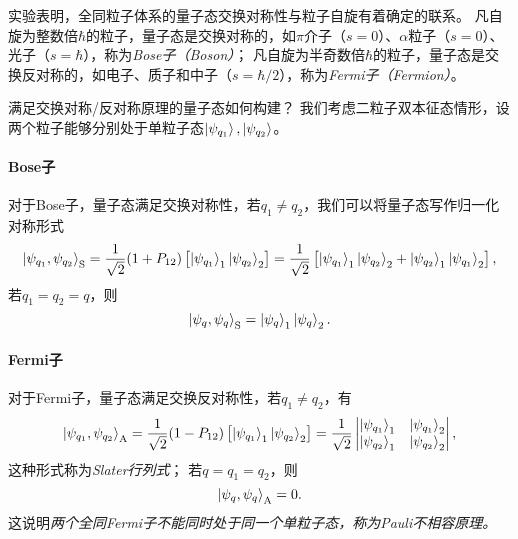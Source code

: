 实验表明，全同粒子体系的量子态交换对称性与粒子自旋有着确定的联系。
凡自旋为整数倍$\hbar$的粒子，量子态是交换对称的，如$\pi$介子（$s=0$）、$\alpha$粒子（$s=0$）、光子（$s=\hbar$），称为\emph{Bose子（Boson）}；
凡自旋为半奇数倍$\hbar$的粒子，量子态是交换反对称的，如电子、质子和中子（$s=\hbar/2$），称为\emph{Fermi子（Fermion）}。

满足交换对称/反对称原理的量子态如何构建？
我们考虑二粒子双本征态情形，设两个粒子能够分别处于单粒子态$\ket{\psi_{q_1}},\ket{\psi_{q_2}}$。

\paragraph{Bose子}
对于Bose子，量子态满足交换对称性，若$q_1\neq q_2$，我们可以将量子态写作归一化对称形式
\begin{equation}
    \ket{\psi_{q_1},\psi_{q_2}}_{\mathrm{S}}
    = \frac{1}{\sqrt{2}} (1+P_{12}) \left[\ket{\psi_{q_1}}_1 \ket{\psi_{q_2}}_2\right]
    = \frac{1}{\sqrt{2}} \left[\ket{\psi_{q_1}}_1 \ket{\psi_{q_2}}_2 + \ket{\psi_{q_2}}_1 \ket{\psi_{q_1}}_2\right],
\end{equation}
若$q_1=q_2=q$，则
\begin{equation}
    \ket{\psi_{q},\psi_{q}}_{\mathrm{S}} = \ket{\psi_q}_1 \ket{\psi_q}_2.
\end{equation}

\paragraph{Fermi子}
对于Fermi子，量子态满足交换反对称性，若$q_1\neq q_2$，有
\begin{equation}
    \ket{\psi_{q_1},\psi_{q_2}}_{\mathrm{A}}
    = \frac{1}{\sqrt{2}} (1-P_{12}) \left[\ket{\psi_{q_1}}_1 \ket{\psi_{q_2}}_2\right]
    = \frac{1}{\sqrt{2}}
    \begin{vmatrix}
        \ket{\psi_{q_1}}_1 & \ket{\psi_{q_1}}_2 \\
        \ket{\psi_{q_2}}_1 & \ket{\psi_{q_2}}_2
    \end{vmatrix},
\end{equation}
这种形式称为\emph{Slater行列式}；
若$q=q_1=q_2$，则
\begin{equation}
    \ket{\psi_q,\psi_q}_{\mathrm{A}} = 0.
\end{equation}
这说明\emph{两个全同Fermi子不能同时处于同一个单粒子态，称为Pauli不相容原理。}

